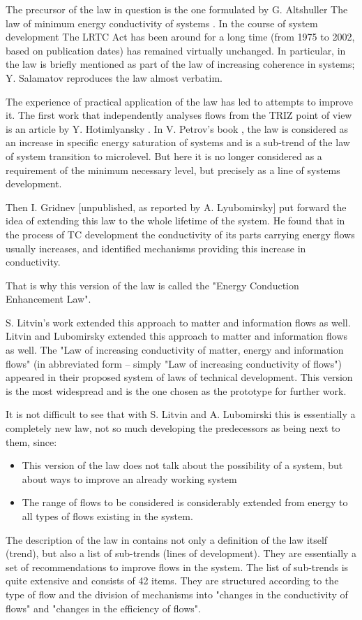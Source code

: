 \documentclass[a4paper,11pt]{article}
\begin{document}
The precursor of the law in question is the one formulated by G. Altshuller
The law of minimum energy conductivity of systems \cite{B1}. In the course of
system development The LRTC Act has been around for a long time (from 1975 to
2002, based on publication dates) has remained virtually unchanged. In
particular, in \cite[p. 1,56]{B2} the law is briefly mentioned as part of the
law of increasing coherence in systems; Y. Salamatov \cite{B3} reproduces the
law almost verbatim.

The experience of practical application of the law has led to attempts to
improve it. The first work that independently analyses flows from the TRIZ
point of view is an article by Y. Hotimlyansky \cite{B4}. In V. Petrov's book
\cite{B5}, the law is considered as an increase in specific energy saturation
of systems and is a sub-trend of the law of system transition to microlevel.
But here it is no longer considered as a requirement of the minimum necessary
level, but precisely as a line of systems development.

Then I. Gridnev [unpublished, as reported by A. Lyubomirsky] put forward the
idea of extending this law to the whole lifetime of the system. He found that
in the process of TC development the conductivity of its parts carrying energy
flows usually increases, and identified mechanisms providing this increase in
conductivity.

That is why this version of the law is called the "Energy Conduction
Enhancement Law".

S. Litvin's work \cite{B6} extended this approach to matter and information
flows as well. Litvin and Lubomirsky \cite{B6} extended this approach to
matter and information flows as well. The "Law of increasing conductivity of
matter, energy and information flows" (in abbreviated form -- simply "Law of
increasing conductivity of flows") appeared in their proposed system of laws
of technical development. This version is the most widespread and is the one
chosen as the prototype for further work.

It is not difficult to see that with S. Litvin and A. Lubomirski this is
essentially a completely new law, not so much developing the predecessors as
being next to them, since:
\begin{itemize}
\item This version of the law does not talk about the possibility of a system,
  but about ways to improve an already working system
\item The range of flows to be considered is considerably extended from energy
  to all types of flows existing in the system.
\end{itemize}
The description of the law in \cite{B6} contains not only a definition of the
law itself (trend), but also a list of sub-trends (lines of development). They
are essentially a set of recommendations to improve flows in the system. The
list of sub-trends is quite extensive and consists of 42 items. They are
structured according to the type of flow and the division of mechanisms into
"changes in the conductivity of flows" and "changes in the efficiency of
flows".
\end{document}
